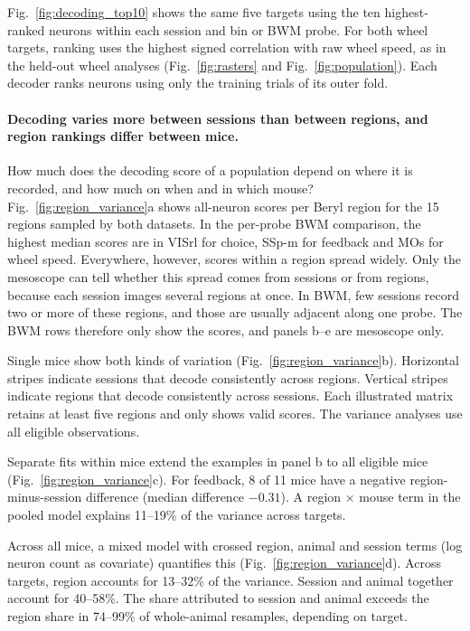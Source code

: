 \documentclass[10pt]{article}
\newcommand{\figref}[1]{Fig.~\ref{fig:#1}}
\begin{document}




\figref{decoding_top10} shows the same five targets using the ten highest-ranked neurons within each session and bin or BWM probe. For both wheel targets, ranking uses the highest signed correlation with raw wheel speed, as in the held-out wheel analyses (\figref{rasters} and \figref{population}). Each decoder ranks neurons using only the training trials of its outer fold.



\FloatBarrier
\paragraph{Decoding varies more between sessions than between regions, and region rankings differ between mice.}
How much does the decoding score of a population depend on where it is recorded, and how much on when and in which mouse? \figref{region_variance}a shows all-neuron scores per Beryl region for the 15 regions sampled by both datasets. In the per-probe BWM comparison, the highest median scores are in VISrl for choice, SSp-m for feedback and MOs for wheel speed. Everywhere, however, scores within a region spread widely. Only the mesoscope can tell whether this spread comes from sessions or from regions, because each session images several regions at once. In BWM, few sessions record two or more of these regions, and those are usually adjacent along one probe. The BWM rows therefore only show the scores, and panels b--e are mesoscope only.

Single mice show both kinds of variation (\figref{region_variance}b). Horizontal stripes indicate sessions that decode consistently across regions. Vertical stripes indicate regions that decode consistently across sessions. Each illustrated matrix retains at least five regions and only shows valid scores. The variance analyses use all eligible observations.

Separate fits within mice extend the examples in panel b to all eligible mice (\figref{region_variance}c). For feedback, 8 of 11 mice have a negative region-minus-session difference (median difference $-0.31$). A region $\times$ mouse term in the pooled model explains 11--19\% of the variance across targets.

Across all mice, a mixed model with crossed region, animal and session terms (log neuron count as covariate) quantifies this (\figref{region_variance}d). Across targets, region accounts for 13--32\% of the variance. Session and animal together account for 40--58\%. The share attributed to session and animal exceeds the region share in 74--99\% of whole-animal resamples, depending on target.
\end{document}
